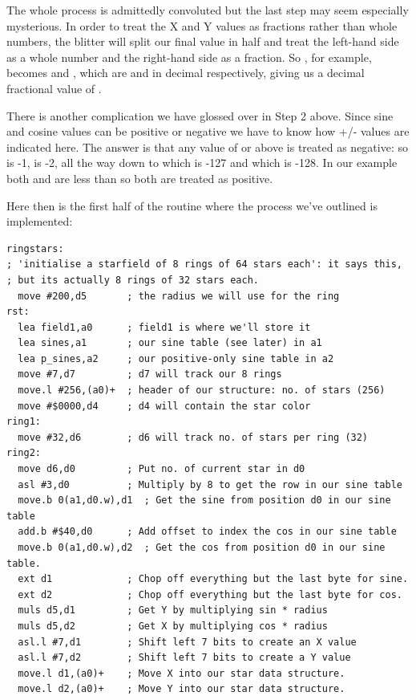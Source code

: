 The whole process is admittedly convoluted but the last step may seem especially mysterious. In order to treat the X and Y values
as fractions rather than whole numbers, the blitter will split our final value in half and treat the left-hand side as a whole number
and the right-hand side as a fraction. So , for example, becomes  and , which are  and 
in decimal respectively, giving us a decimal fractional value of .

There is another complication we have glossed over in Step 2 above. Since sine and cosine values can be positive or negative
we have to know how +/- values are indicated here. The answer is that any value of  or above is treated
as negative: so  is -1,  is -2, all the way down to  which is -127 and
 which is -128. In our example both  and  are less than  so both are
treated as positive.

Here then is the first half of the  routine where the process we've outlined is implemented:
\clearpage

\begin{lstlisting}
ringstars:
; 'initialise a starfield of 8 rings of 64 stars each': it says this,
; but its actually 8 rings of 32 stars each.
  move #200,d5       ; the radius we will use for the ring
rst:
  lea field1,a0      ; field1 is where we'll store it
  lea sines,a1       ; our sine table (see later) in a1
  lea p_sines,a2     ; our positive-only sine table in a2
  move #7,d7         ; d7 will track our 8 rings
  move.l #256,(a0)+  ; header of our structure: no. of stars (256)
  move #$0000,d4     ; d4 will contain the star color
ring1:
  move #32,d6        ; d6 will track no. of stars per ring (32)
ring2:
  move d6,d0         ; Put no. of current star in d0 
  asl #3,d0          ; Multiply by 8 to get the row in our sine table
  move.b 0(a1,d0.w),d1  ; Get the sine from position d0 in our sine table
  add.b #$40,d0      ; Add offset to index the cos in our sine table   
  move.b 0(a1,d0.w),d2  ; Get the cos from position d0 in our sine table.
  ext d1             ; Chop off everything but the last byte for sine.
  ext d2             ; Chop off everything but the last byte for cos.
  muls d5,d1         ; Get Y by multiplying sin * radius
  muls d5,d2         ; Get X by multiplying cos * radius
  asl.l #7,d1        ; Shift left 7 bits to create an X value
  asl.l #7,d2        ; Shift left 7 bits to create a Y value
  move.l d1,(a0)+    ; Move X into our star data structure.
  move.l d2,(a0)+    ; Move Y into our star data structure.
\end{lstlisting}

